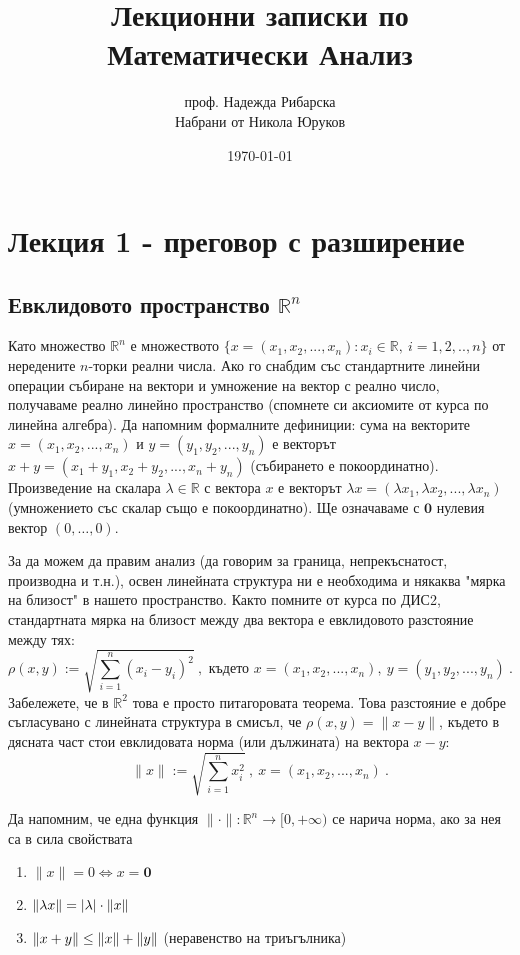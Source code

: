 \documentclass[11pt]{article}
\title{Лекционни записки по Математически Анализ}
\author{проф. Надежда Рибарска \\ Набрани от Никола Юруков}
\date{\today}
\numberwithin{equation}{section}
\numberwithin{figure}{section}
\numberwithin{table}{section}
\theoremstyle{plain}
\theoremstyle{definition}
\theoremstyle{remark}
\theoremstyle{definition}
\theoremstyle{remark}
\theoremstyle{plain}
\theoremstyle{definition}
\theoremstyle{definition}
\theoremstyle{plain}
\theoremstyle{plain}
\theoremstyle{plain}
\theoremstyle{definition}
\theoremstyle{plain}
\DeclarePairedDelimiter\norm{\lVert}{\rVert}
\renewcommand*{\Vec}[1]{\mathbf{#1}}
\newcommand*{\Z}{\Vec{0}}
\begin{document}
\maketitle

\clearpage

\tableofcontents

\clearpage

\section{Лекция 1 - преговор с разширение}

\subsection{Евклидовото пространство $\mathbb{R}^n$}

Като множество $\mathbb{R}^n$ е множеството $\{x = (x_1, x_2, ..., x_n): x_i \in \mathbb{R}, \  i=1,2,..,n\}$ от нередените $n$-торки реални числа. Ако го снабдим със стандартните линейни операции събиране на вектори и умножение на вектор с реално число, получаваме реално линейно пространство (спомнете си аксиомите от курса по линейна алгебра). Да напомним формалните дефиниции: сума на векторите $x = (x_1, x_2, ..., x_n)$ и $y = (y_1, y_2, ..., y_n)$ е векторът $x+y = (x_1+y_1, x_2+y_2, ..., x_n + y_n)$ (събирането е покоординатно). Произведение на скалара $\lambda \in \mathbb{R}$ с вектора $x$ е векторът $\lambda x = (\lambda x_1, \lambda x_2, ..., \lambda x_n)$ (умножението със скалар също е покоординатно). Ще означаваме с $\Z$ нулевия вектор $(0,\dots ,0)$.

За да можем да правим анализ (да говорим за граница, непрекъснатост, производна и т.н.), освен линейната структура ни е необходима и някаква "мярка на близост" в нашето пространство. Както помните от курса по ДИС2, стандартната мярка на близост  между два вектора е евклидовото разстояние между тях:
 $$\rho(x,y):= \sqrt{\sum_{i=1}^n (x_i-y_i)^2} \ , \mbox{ където } x = (x_1, x_2, ..., x_n), \ y = (y_1, y_2, ..., y_n) \ .$$
 Забележете, че в $\mathbb{R}^2$ това е просто питагоровата теорема. Това разстояние е добре съгласувано с линейната структура в смисъл, че $\rho(x,y)=\lVert x - y\rVert$, където в дясната част стои евклидовата норма (или дължината) на вектора $x-y$:
 $$\lVert x\rVert := \sqrt{\sum_{i=1}^n x_i^2}\ , \ x = (x_1, x_2, ..., x_n) \ .$$

 Да напомним, че една функция $\lVert \cdot \rVert :\mathbb{R}^n \longrightarrow [0,+\infty)$ се нарича норма, ако за нея са в сила свойствата
\begin{enumerate}
	\item $\lVert x \rVert = 0 \iff x=\Z$
	\item $\norm{\lambda x} = |\lambda|\cdot \norm{x}$
	\item $\norm{x+y} \leq \norm{x} + \norm{y}$ (неравенство на триъгълника)
\end{enumerate}
\end{document}
